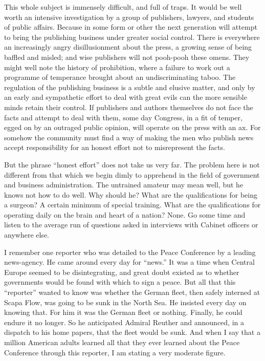 \documentclass[openany,nobib,nohyper]{tufte-book}
\begin{document}
This whole subject is immensely difficult, and full of traps. It would
be well worth an intensive investigation by a group of publishers,
lawyers, and students of public affairs. Because in some form or other
the next generation will attempt to bring the publishing business under
greater social control. There is everywhere an increasingly angry
disillusionment about the press, a growing sense of being baffled and
misled; and wise publishers will not pooh-pooh these omens. They might
well note the history of prohibition, where a failure to work out a
programme of temperance brought about an undiscriminating taboo. The
regulation of the publishing business is a subtle and elusive matter,
and only by an early and sympathetic effort to deal with great evils can
the more sensible minds retain their control. If publishers and authors
themselves do not face the facts and attempt to deal with them, some day
Congress, in a fit of temper, egged on by an outraged public opinion,
will operate on the press with an ax. For somehow the community must
find a way of making the men who publish news accept responsibility for
an honest effort not to misrepresent the facts.

But the phrase ``honest effort'' does not take us very far. The problem
here is not different from that which we begin dimly to apprehend in the
field of government and business administration. The untrained amateur
may mean well, but he knows not how to do well. Why should he? What are
the qualifications for being a surgeon? A certain minimum of special
training. What are the qualifications for operating daily on the brain
and heart of a nation? None. Go some time and listen to the average run
of questions asked in interviews with Cabinet officers or anywhere else.

\enlargethispage{\baselineskip}

I remember one reporter who was detailed to the Peace Conference by a
leading news-agency. He came around every day for ``news.'' It was a
time when Central Europe seemed to be disintegrating, and great doubt
existed as to whether governments would be found with which to sign a
peace. But all that this ``reporter'' wanted to know was whether the
German fleet, then safely interned at Scapa Flow, was going to be sunk
in the North Sea. He insisted every day on knowing that. For him it was
the German fleet or nothing. Finally, he could endure it no longer. So
he anticipated Admiral Reuther and announced, in a dispatch to his home
papers, that the fleet would be sunk. And when I say that a million
American adults learned all that they ever learned about the Peace
Conference through this reporter, I am stating a very moderate figure.
\end{document}
